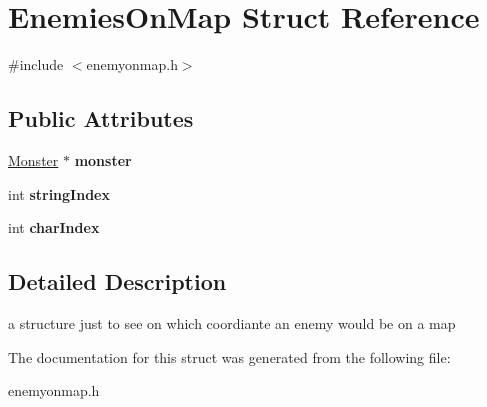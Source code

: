 \hypertarget{struct_enemies_on_map}{}\section{Enemies\+On\+Map Struct Reference}
\label{struct_enemies_on_map}


{\ttfamily \#include $<$enemyonmap.\+h$>$}

\subsection*{Public Attributes}
\begin{DoxyCompactItemize}
\item 
\hypertarget{struct_enemies_on_map_a0a241a198803a47b8f495e84051523e8}{}\label{struct_enemies_on_map_a0a241a198803a47b8f495e84051523e8} 
\hyperlink{class_monster}{Monster} $\ast$ {\bfseries monster}
\item 
\hypertarget{struct_enemies_on_map_adedb5b7ec6aa042d666a4ae11d4c3f15}{}\label{struct_enemies_on_map_adedb5b7ec6aa042d666a4ae11d4c3f15} 
int {\bfseries string\+Index}
\item 
\hypertarget{struct_enemies_on_map_a9f1724d8fe125d54cdb40f8ca2bcf301}{}\label{struct_enemies_on_map_a9f1724d8fe125d54cdb40f8ca2bcf301} 
int {\bfseries char\+Index}
\end{DoxyCompactItemize}


\subsection{Detailed Description}
a structure just to see on which coordiante an enemy would be on a map 

The documentation for this struct was generated from the following file\+:\begin{DoxyCompactItemize}
\item 
enemyonmap.\+h\end{DoxyCompactItemize}
